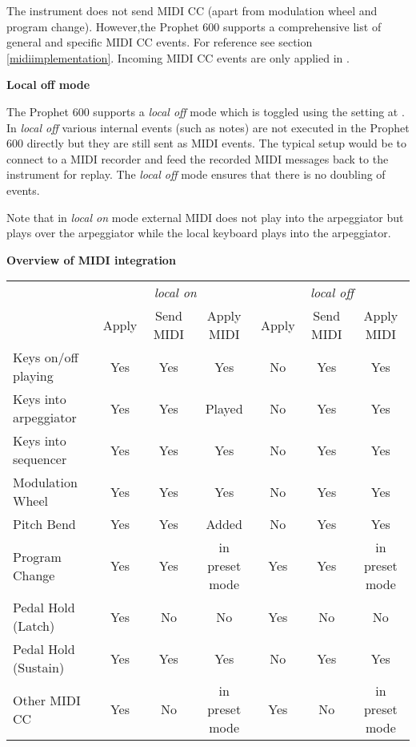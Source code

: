 The instrument does not send MIDI CC (apart from modulation wheel and program change). However,the Prophet 600 supports a comprehensive list of general and specific MIDI CC events. For reference see section \ref{midiimplementation}. Incoming MIDI CC events are only applied in \presetmode.

\textbf{Local off mode}

The Prophet 600 supports a \textit{local off} mode which is toggled using the setting at . In \textit{local off} various internal events (such as notes) are not executed in the Prophet 600 directly but they are still sent as MIDI events. The typical setup would be to connect to a MIDI recorder and feed the recorded MIDI messages back to the instrument for replay. The \textit{local off} mode ensures that there is no doubling of events.

Note that in \textit{local on} mode external MIDI does not play into the arpeggiator but plays over the arpeggiator while the local keyboard plays into the arpeggiator.

\textbf{Overview of MIDI integration}

\begin{table}[H]
  \begin{tabular}{lcccccc}
     &
      \multicolumn{3}{c}{\textit{local on}} &
      \multicolumn{3}{c}{\textit{local off}} \\   \cline{2-7} 
    & Apply & Send MIDI & Apply MIDI & Apply & Send MIDI & Apply MIDI \\
    \hline
      \vline Keys on/off playing	& Yes & Yes	& Yes & No & Yes & Yes \\
      Keys into arpeggiator	& Yes & Yes	& Played & No & Yes & Yes \\
      Keys into sequencer	& Yes & Yes	& Yes & No & Yes & Yes \\
      Modulation Wheel	& Yes & Yes	& Yes & No & Yes & Yes \\
      Pitch Bend	& Yes & Yes	& Added & No & Yes & Yes \\
      Program Change	& Yes & Yes	& in preset mode & Yes & Yes & in preset mode \\
      Pedal Hold (Latch)	& Yes & No & No & Yes & No & No \\
      Pedal Hold (Sustain)	& Yes & Yes & Yes & No & Yes & Yes \\
      Other MIDI CC	& Yes & No & in preset mode & Yes & No & in preset mode \\
  \end{tabular}
\end{table}

